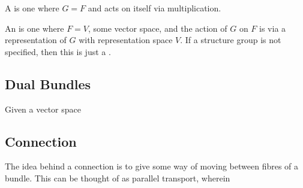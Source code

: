 \documentclass{article}
\begin{document}
\begin{definition}
A  is one where $G=F$ and acts on itself via multiplication. 
\end{definition}

\begin{definition}
An  is one where $F=V$, some vector space, and the action of $G$ on $F$ is via a representation of $G$ with representation space $V$. If a structure group is not specified, then this is just a . 
\end{definition}

\subsection{Dual Bundles}

\begin{idea}
Given a vector space 
\end{idea}

\subsection{Connection}

\begin{idea}
The idea behind a connection is to give some way of moving between fibres of a bundle. This can be thought of as parallel transport, wherein 
\end{idea}
\end{document}
